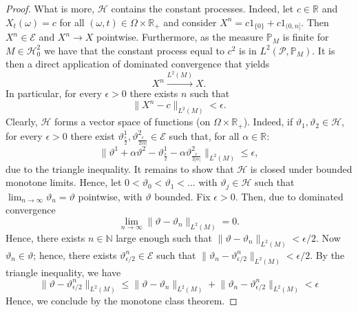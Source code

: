 \documentclass[11pt,a4paper,twoside,openany]{report}
\numberwithin{equation}{section}
\theoremstyle{plain} %
\theoremstyle{definition} %
\theoremstyle{remark} %
\begin{document}
\begin{proof}
    What is more, \(\mathcal{H}\) contains the constant processes. Indeed, let \(c\in\mathbb{R}\) and  \(X_t(\omega)=c\) for all \((\omega,t)\in\Omega\times \mathbb{R}_+\) and consider \(X^n=c1_{\{0\}}+c1_{(0,n]}\). Then \(X^n\in \mathcal{E}\) and \(X^n\to X\) pointwise. Furthermore, as the measure \(\mathbb{P}_M\) is finite for \(M\in\mathcal{H}_0^2\) we have that the constant process equal to \(c^2\) is in \(L^2(\mathcal{P},\mathbb{P}_M)\). It is then a direct application of dominated convergence that yields 
    \begin{equation*}
        X^n\overset{L^2(M)}{\to}X.
    \end{equation*}
In particular, for every \(\epsilon>0\) there exists \(n\) such that 
\begin{equation*}
    \lVert X^n-c\rVert_{L^2(M)}<\epsilon.
\end{equation*}
Clearly, \(\mathcal{H}\) forms a vector space of functions (on \(\Omega\times\mathbb{R}_+\)). Indeed, if \(\vartheta_1,\vartheta_2\in\mathcal{H}\), for every \(\epsilon>0\) there exist \(\vartheta^1_{\frac{\epsilon}{2}},\vartheta^2_{\frac{\epsilon}{2|\alpha|}}\in\mathcal{E}\) such that, for all \(\alpha\in\mathbb{R}\):
    \begin{equation*}
        \lVert \vartheta^1+\alpha \vartheta^2- \vartheta^1_{\frac{\epsilon}{2}}-\alpha \vartheta^2_{\frac{\epsilon}{2|\alpha|}} \rVert_{L^2(M)}\leq \epsilon,
    \end{equation*}
    due to the triangle inequality.
 It remains to show that \(\mathcal{H}\) is closed under bounded monotone limits. Hence, let \(0<\vartheta_0<\vartheta_1<\dots\) with \(\vartheta_j\in\mathcal{H}\) such that \(\lim_{n\to\infty}\vartheta_n = \vartheta\) pointwise, with \(\vartheta\) bounded. Fix \(\epsilon>0\). Then, due to dominated convergence 
    \begin{equation*}
        \lim_{n\to\infty}\lVert \vartheta-\vartheta_n\rVert_{L^2(M)}=0.
    \end{equation*}
    Hence, there exists \(n\in\mathbb{N}\) large enough such that \(\lVert \vartheta-\vartheta_n\rVert_{L^2(M)}<\epsilon/2\). Now \(\vartheta_n\in\mathcal{\vartheta}\); hence, there exists \(\vartheta^n_{\epsilon/2}\in \mathcal{E}\) such that \(\lVert \vartheta_n-\vartheta^n_{\epsilon/2}\rVert_{L^2(M)}<\epsilon/2\). By the triangle inequality, we have
    \begin{equation*}
        \lVert \vartheta-\vartheta^n_{\epsilon/2}\rVert_{L^2(M)}\leq\lVert \vartheta-\vartheta_n\rVert_{L^2(M)}+\lVert \vartheta_n-\vartheta^n_{\epsilon/2}\rVert_{L^2(M)}<\epsilon
    \end{equation*}
 Hence, we conclude by the monotone class theorem. 
\end{proof}
\end{document}
